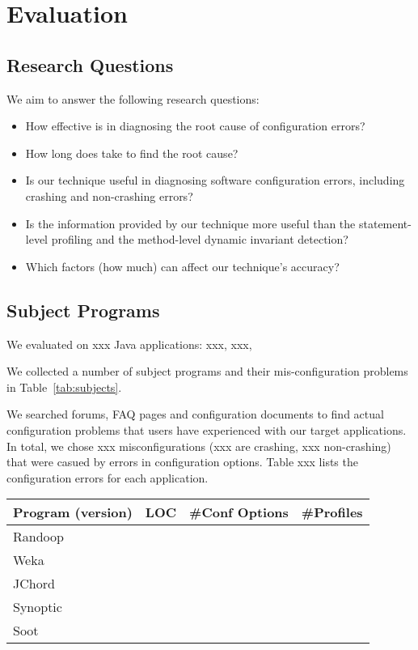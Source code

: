 \section{Evaluation}
\label{sec:evaluation}

\subsection{Research Questions}

We aim to answer the following research questions:

\begin{itemize}
\item How effective is \ourtool in diagnosing the root cause of
configuration errors?
\item How long does \ourtool take to find the root cause?
\item Is our technique useful in diagnosing software configuration errors, including
crashing and non-crashing errors?
\item Is the information provided by our technique more useful than the statement-level
profiling and the method-level dynamic invariant detection?
\item Which factors (how much) can affect our technique's accuracy?
\end{itemize}

\subsection{Subject Programs}

We evaluated \ourtool on xxx Java applications: xxx, xxx,

We collected a number of subject programs and their mis-configuration problems in
Table~\ref{tab:subjects}.

We searched forums, FAQ pages and configuration documents to find
actual configuration problems that users have experienced with our
target applications. In total, we chose xxx misconfigurations (xxx
are crashing, xxx non-crashing) that were casued by errors in
configuration options. Table xxx lists the configuration errors for each application.

\begin{table}[t]
\begin{tabular}{lccc}
\hline
 Program (version) & LOC & \#Conf Options & \#Profiles\\
 \hline
 \hline
 Randoop & & & \\
 Weka &  & & \\
 JChord & & & \\
 Synoptic & && \\
 Soot &  &  & \\
\hline
\end{tabular}


\end{table}

